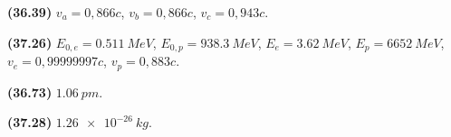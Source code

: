 \ifdefined \wholebook \else\documentclass[oneside]{book}\usepackage{EdlBook}\graphicspath{{figures/}}
\begin{document}
\begin{tcolorbox}
\begin{enumerate*}[label = ]
  \item \textbf{(36.39)} $v_a = 0,866c$, $v_b = 0,866c$, $v_c = 0,943c$.
  \item \textbf{(37.26)} $E_{0,e} = \SI{0.511}{MeV}$, $E_{0,p} = \SI{938.3}{MeV}$, $E_e = \SI{3.62}{MeV}$, $E_p = \SI{6652}{MeV}$, $v_e = 0,99999997c$, $v_p = 0,883c$.
  \item \textbf{(36.73)} $\SI{1.06}{pm}$. \\
  \item \textbf{(37.28)} $\SI{1.26e-26}{kg}$.
\end{enumerate*}
\end{tcolorbox}

\newpage

\ifdefined \wholebook \else
 \printindex
\end{document}

